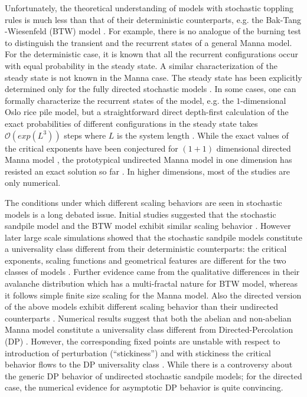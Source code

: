 \documentclass[11pt,a4paper]{book}
\begin{document}
Unfortunately, the theoretical understanding of models with 
stochastic toppling rules is much less than that of their deterministic 
counterparts, e.g. the Bak-Tang -Wiesenfeld (BTW) model \cite{btw}.  For 
example, there is no analogue of the burning test  
to distinguish the transient and  the recurrent states of a 
general Manna model. For the deterministic case, it is known that 
all the recurrent configurations occur with equal probability in the 
steady state. A similar characterization of the steady state is not 
known in the Manna case.  The steady state has been 
explicitly determined only for the fully directed stochastic models 
\cite{asap,rittenberg,kloster,paczuski}. In some cases, one can formally characterize the 
recurrent states of the model, e.g. the $1$-dimensional Oslo rice pile 
model, but a straightforward direct depth-first
calculation of the exact
probabilities of different configurations in the steady state takes 
$\mathcal{O}(exp{(L^3)})$ steps where $L$ is the system length
\cite{dharoslo}. While 
the exact values of the critical exponents have been conjectured for $(1+1)$ 
dimensional directed Manna model \cite{kloster,paczuski}, the 
prototypical undirected Manna model in one dimension has resisted an 
exact solution so far \cite{dickman1,dickman2,dickman3}. 
In higher 
dimensions, most of the studies are only numerical.

The conditions under which different scaling behaviors are seen in stochastic models is a long debated issue.
Initial studies suggested that the stochastic sandpile model and the BTW model exhibit
similar scaling behavior
\cite{guilera,pietronero,vespignani}. However
later large
scale simulations showed that the stochastic
sandpile models constitute a universality class different from
their deterministic counterparts: the critical exponents, scaling
functions and geometrical features are different for the two classes
of models
\cite{biham,lubeck1,milshtein,lubeck3,tebaldi,campelo}. Further evidence came from the
qualitative differences in their avalanche distribution which has a
multi-fractal nature for BTW model, whereas it follows simple finite
size scaling \cite{dickman1,tebaldi,campelo} for the Manna model. Also the directed version of the above models exhibit different scaling
behavior than their undirected counterparts \cite{satorras}.
Numerical results suggest that both the abelian and non-abelian
Manna model constitute a universality class \cite{biham2} different from
Directed-Percolation (DP) \cite{bonachela1}. 
However, the corresponding fixed points are unstable with respect to
introduction of perturbation (``stickiness'') and with stickiness the
critical behavior flows to the DP universality class
\cite{mohanty1,bonachela2,mohanty2}. While there is
a controversy about the generic DP behavior of undirected stochastic
sandpile models; for the directed case, the numerical evidence for
asymptotic DP behavior is quite convincing.
\end{document}
